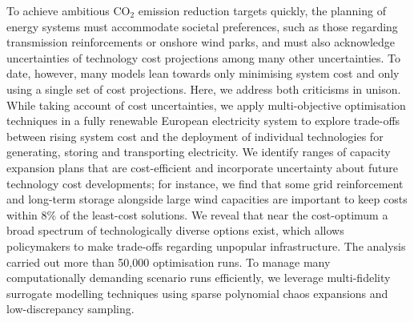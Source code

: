 To achieve ambitious CO$_2$ emission reduction targets quickly, the planning of
energy systems must accommodate societal preferences, such as those regarding
transmission reinforcements or onshore wind parks, and must also acknowledge
uncertainties of technology cost projections among many other uncertainties. To
date, however, many models lean towards only minimising system cost and only
using a single set of cost projections. Here, we address both criticisms in
unison. While taking account of cost uncertainties, we apply multi-objective
optimisation techniques in a fully renewable European electricity system to
explore trade-offs between rising system cost and the deployment of individual
technologies for generating, storing and transporting electricity. We identify
ranges of capacity expansion plans that are cost-efficient and incorporate
uncertainty about future technology cost developments; for instance, we find
that some grid reinforcement and long-term storage alongside large wind
capacities are important to keep costs within 8\% of the least-cost solutions.
We reveal that near the cost-optimum a broad spectrum of technologically diverse
options exist, which allows policymakers to make trade-offs regarding unpopular
infrastructure. The analysis carried out more than 50,000 optimisation runs. To
manage many computationally demanding scenario runs efficiently, we leverage
multi-fidelity surrogate modelling techniques using sparse polynomial chaos
expansions and low-discrepancy sampling.
